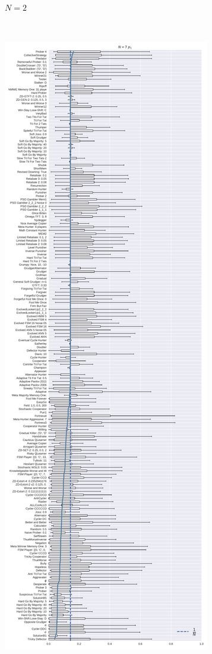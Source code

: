 \documentclass{article}
\begin{document}
\begin{figure}[!hbtp]
\begin{subfigure}[t]{.3\textwidth}
        \caption{\(N=2\)}
    \end{subfigure}%
    ~
    \begin{subfigure}[t]{.3\textwidth}
        \centering
        \includegraphics[width=\textwidth]{../img/boxplot_7_invade.pdf}

\end{subfigure}
\end{figure}
\end{document}
